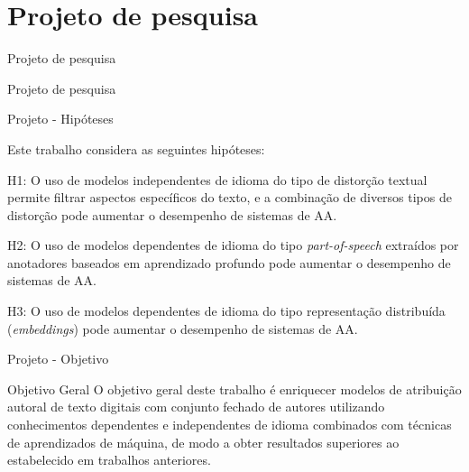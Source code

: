 \section{Projeto de pesquisa}

\begin{frame}{Projeto de pesquisa}
	\begin{alertblock}{Projeto de pesquisa }
	\end{alertblock}
\end{frame}



\begin{frame} {Projeto - Hipóteses}

Este trabalho considera as seguintes hipóteses:

\begin{block}{H1:} O uso de modelos independentes de idioma do tipo de distorção textual permite filtrar aspectos específicos do texto, e a combinação de diversos tipos de distorção pode aumentar o desempenho de sistemas de AA.
\end{block}

\begin{block}{H2:} O uso de modelos dependentes de idioma do tipo {\it part-of-speech} extraídos por anotadores baseados em aprendizado profundo pode aumentar o desempenho de sistemas de AA.
\end{block}


\begin{block}{H3:} O uso de modelos dependentes de idioma do tipo representação distribuída ({\it embeddings}) pode aumentar o desempenho de sistemas de AA.
\end{block}

\end{frame}

\begin{frame}{Projeto - Objetivo}
\begin{block}{Objetivo Geral}
O objetivo geral deste trabalho é enriquecer modelos de atribuição autoral de texto digitais com conjunto fechado de autores utilizando conhecimentos dependentes e independentes de idioma combinados com técnicas de aprendizados de máquina, de modo a obter resultados superiores ao estabelecido em trabalhos anteriores.
\end{block}
\end{frame}


